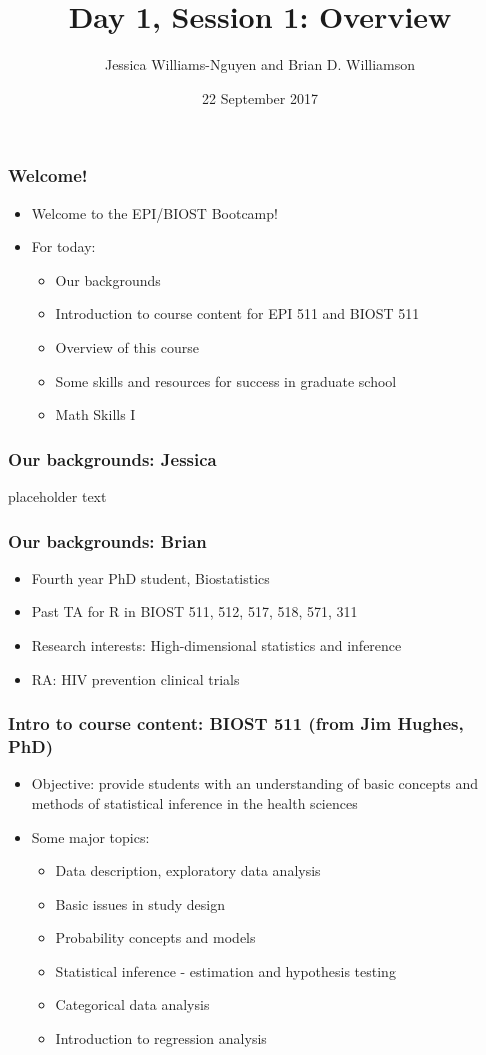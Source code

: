 \documentclass[12pt]{beamer}
\title{Day 1, Session 1: Overview}
\author{Jessica Williams-Nguyen and Brian D. Williamson}
\institute{EPI/BIOST Bootcamp 2017}
\date{22 September 2017}
\newcommand{\myframe}[1]{\begin{frame} \frametitle{#1}}
\newenvironment{spaceitemize}
{ \begin{itemize}
    \setlength{\itemsep}{10pt}
    \setlength{\parskip}{0pt}
    \setlength{\parsep}{0pt}     }
{ \end{itemize}                  }
\begin{document}
\begin{frame}
\titlepage
\end{frame}

\myframe{Welcome!}
\begin{spaceitemize}
\item Welcome to the EPI/BIOST Bootcamp!
\item For today:
\begin{spaceitemize}
\item Our backgrounds
\item Introduction to course content for EPI 511 and BIOST 511
\item Overview of this course
\item Some skills and resources for success in graduate school
\item Math Skills I
\end{spaceitemize}
\end{spaceitemize}
\end{frame}

\myframe{Our backgrounds: Jessica}
placeholder text
\end{frame}

\myframe{Our backgrounds: Brian}
\centering
\begin{spaceitemize}
\item Fourth year PhD student, Biostatistics
\item Past TA for R in BIOST 511, 512, 517, 518, 571, 311
\item Research interests: High-dimensional statistics and inference
\item RA: HIV prevention clinical trials
\end{spaceitemize}
\end{frame}

\myframe{Intro to course content: BIOST 511 (from Jim Hughes, PhD)}
\begin{spaceitemize}
\item Objective: provide students with an understanding of basic concepts and methods of statistical inference in the health sciences
\item Some major topics:
\begin{spaceitemize}
\item Data description, exploratory data analysis
\item Basic issues in study design
\item Probability concepts and models
\item Statistical inference - estimation and hypothesis testing
\item Categorical data analysis
\item Introduction to regression analysis
\end{spaceitemize}
\end{spaceitemize}
\end{frame}
\end{document}

